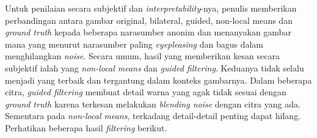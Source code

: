 \documentclass[11pt, a4paper, final]{report}
\begin{document}
Untuk penilaian secara subjektif dan \textit{interpretability}-nya, penulis memberikan perbandingan antara gambar original, bilateral, guided, non-local means dan \textit{ground truth} kepada beberapa narasumber anonim dan menanyakan gambar mana yang menurut narasumber paling \textit{eyepleasing} dan bagus dalam menghilangkan \textit{noise}. Secara umum, hasil yang memberikan kesan secara subjektif ialah yang \textit{non-local means} dan \textit{guided filtering}. Keduanya tidak selalu menjadi yang terbaik dan tergantung dalam konteks gambarnya. Dalam beberapa citra, \textit{guided filtering} membuat detail warna yang agak tidak sesuai dengan \textit{ground truth} karena terkesan melakukan \textit{blending noise} dengan citra yang ada. Sementara pada \textit{non-local means}, terkadang detail-detail penting dapat hilang. Perhatikan beberapa hasil \textit{filtering} berikut.
\end{document}
